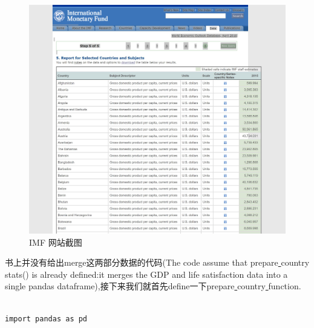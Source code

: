\documentclass[UTF8]{ctexart}
\begin{document}
\begin{figure}[H]
\centering
\includegraphics[width = 6in]{imf.JPG}
\caption{IMF 网站截图}
\end{figure}

书上并没有给出merge这两部分数据的代码(The code assume that prepare\underline{ }country\underline{ }stats() is already defined:it merges the GDP and life satisfaction data into a single pandas dataframe),接下来我们就首先define一下prepare\underline{ }country\underline{ } function.

\begin{lstlisting}

import pandas as pd



\end{lstlisting}
\end{document}
